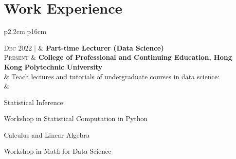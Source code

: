 \documentclass[10pt, oneside]{article}
\begin{document}
\section*{Work Experience}
\begin{tabularx}{\linewidth}{p{2.2cm}|p{16cm}}
	\toprule 

	\textsc{Dec} 2022 | & \textbf{Part-time Lecturer (Data Science)}\\
	\textsc{Present}  & \textbf{College of Professional and Continuing Education, Hong Kong Polytechnic University}\\
	& Teach lectures and tutorials of undergraduate courses in data science:\\
	&	\begin{itemize}
		\vspace{0.2cm}
	\begin{minipage}{0.55\linewidth}
		\item Statistical Inference
		\item Workshop in Statistical Computation in Python
	\end{minipage}
	\begin{minipage}{0.45\linewidth}
		\item Calculus and Linear Algebra
		\item Workshop in Math for Data Science
	\end{minipage}
	\end{itemize}
	\\\\


\end{tabularx}
\end{document}
